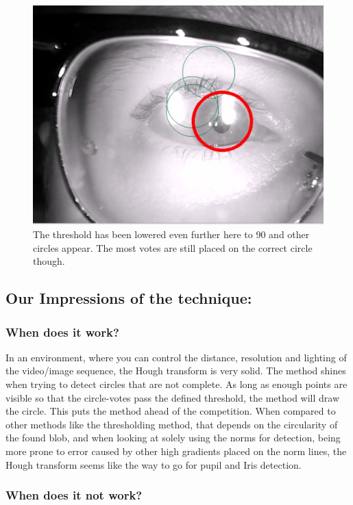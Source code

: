 \begin{figure}[htbp]
\centering
\includegraphics{pics/hough/16.png}
\caption{The threshold has been lowered even further here to 90 and
other circles appear. The most votes are still placed on the correct
circle though. \label{label16}}
\end{figure}

\subsection{Our Impressions of the technique:}

\subsubsection{When does it work?}

In an environment, where you can control the distance, resolution and
lighting of the video/image sequence, the Hough transform is very solid.
The method shines when trying to detect circles that are not complete.
As long as enough points are visible so that the circle-votes pass the
defined threshold, the method will draw the circle. This puts the method
ahead of the competition. When compared to other methods like the
thresholding method, that depends on the circularity of the found blob,
and when looking at solely using the norms for detection, being more
prone to error caused by other high gradients placed on the norm lines,
the Hough transform seems like the way to go for pupil and Iris
detection.

\subsubsection{When does it not work?}

